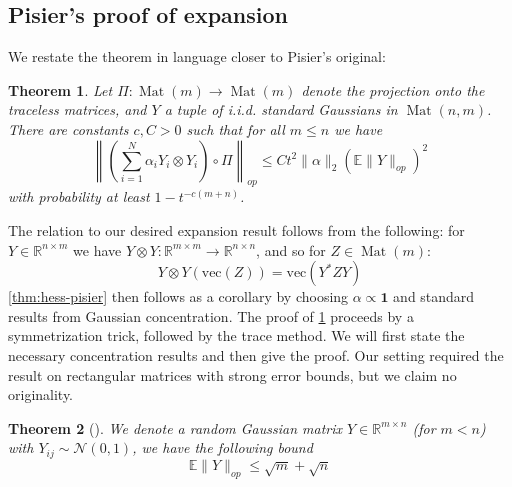 \documentclass[aos]{imsart}
\newtheorem{theorem}{Theorem}[section]
\theoremstyle{definition}
\numberwithin{equation}{section}
\DeclareMathOperator{\mat}{Mat}
\newcommand{\R}{{\mathbb{R}}}
\renewcommand{\vec}{\bm}
\newcommand{\E}{\mathbb{E}}
\newcommand{\samp}{x}
\newcommand{\CF}[1]{{\color{purple}[CF: #1]}}
\begin{document}
\begin{appendix}




\section{Pisier's proof of expansion}\label{sec:pisier}
We restate the theorem in language closer to Pisier's original:

\begin{theorem}\label{thm:Pisier-expansion}
Let $\Pi: \mat(m) \to \mat(m)$ denote the projection onto the traceless matrices, and $Y$ a tuple of i.i.d. standard Gaussians in $\mat(n,m)$. There are constants $c,C > 0$ such that for all $m \leq n$ we have
\[ \left\| \left(\sum_{i=1}^{N} \alpha_{i} Y_{i} \otimes Y_{i}\right) \circ \Pi \right\|_{op} \leq C t^{2} \|\alpha\|_{2} \left( \E \|Y\|_{op} \right)^{2} \]
with probability at least $ 1- t^{-c(m+n)}$.
\end{theorem}

The relation to our desired expansion result follows from the following: for $Y \in \R^{n \times m}$ we have $Y \otimes Y : \R^{m \times m} \to \R^{n \times n}$, and so for $Z \in \mat(m)$: 
\[ Y \otimes Y (\text{vec}(Z)) = \text{vec}( Y^{*} Z Y)      \]
\cref{thm:hess-pisier} then follows as a corollary by choosing $\alpha \propto \vec{1}$ and standard results from Gaussian concentration. The proof of \cref{thm:Pisier-expansion} proceeds by a symmetrization trick, followed by the trace method. We will first state the necessary concentration results and then give the proof. Our setting required the result on rectangular matrices with strong error bounds, but we claim no originality.

\begin{theorem}[\cite{P86}]
We denote a random Gaussian matrix $Y \in \R^{m \times n}$ (for $m < n$) with $Y_{ij} \sim \mathcal{N}(0,1)$, we have the following bound
\[ \E \|Y\|_{op} \leq \sqrt{m} + \sqrt{n} \]
\end{theorem}



\end{appendix}
\end{document}
